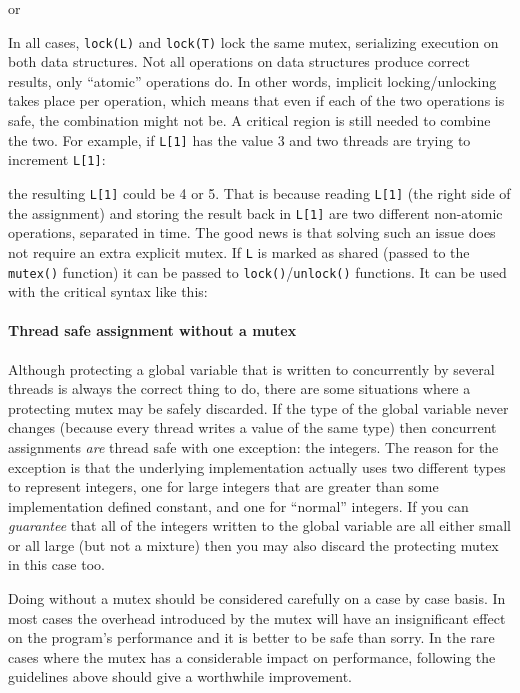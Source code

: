 or


In all cases, \texttt{lock(L)} and \texttt{lock(T)} lock the same mutex,
serializing execution on both data structures. Not all operations on data
structures produce correct results, only ``atomic'' operations do. In other
words, implicit locking/unlocking takes place per operation, which means that
even if each of the two operations is safe, the combination might not be. A
critical region is still needed to combine the two.  For example, if
\texttt{L[1]} has the value 3 and two threads are trying to increment
\texttt{L[1]}:


the resulting \texttt{L[1]} could be 4 or 5. That is because reading
\texttt{L[1]} (the right side of the assignment) and storing the result back in
\texttt{L[1]} are two different non-atomic operations, separated in time. The
good news is that solving such an issue does not require an extra explicit
mutex. If \texttt{L} is marked as shared (passed to the \texttt{mutex()}
function) it can be passed to \texttt{lock()}/\texttt{unlock()} functions. It
can be used with the critical syntax like this:


\paragraph{Thread safe assignment without a mutex}
\label{ThreadSafeAssignment}
Although protecting a global variable that is written to concurrently by several
threads is always the correct thing to do, there are some situations where a
protecting mutex may be safely discarded. If the type of the global variable
never changes (because every thread writes a value of the same type) then
concurrent assignments {\em are} thread safe with one exception: the
integers. The reason for the exception is that the underlying implementation
actually uses two different types to represent integers, one for large integers
that are greater than some implementation defined constant, and one for
``normal'' integers.  If you can {\em guarantee} that all of the integers
written to the global variable are all either small or all large (but not a
mixture) then you may also discard the protecting mutex in this case too.

Doing without a mutex should be considered carefully on a case by case basis.
In most cases the overhead introduced by the mutex will have an insignificant
effect on the program's performance and it is better to be safe than sorry.  
In the rare cases where the mutex has a considerable impact on performance,
following the guidelines above should give a worthwhile improvement.

